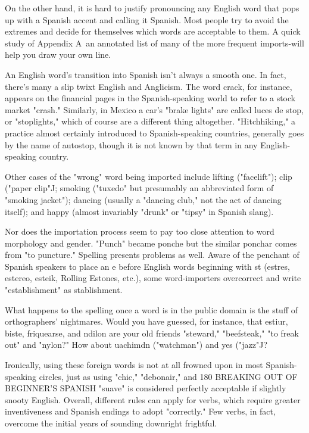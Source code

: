 On the other hand, it is hard to justify pronouncing any English word that pops up with a Spanish accent and calling it Spanish.
Most people try to avoid the extremes and decide for themselves which
words are acceptable to them. A quick study of Appendix A~an annotated list of many of the more frequent imports-will help you draw
your own line.

An English word's transition into Spanish isn't always a
smooth one. In fact, there's many a slip twixt English and Anglicism.
The word crack, for instance, appears on the financial pages in the
Spanish-speaking world to refer to a stock market "crash." Similarly,
in Mexico a car's "brake lights" are called luces de stop, or "stoplights," which of course are a different thing altogether. "Hitchhiking,"
a practice almost certainly introduced to Spanish-speaking countries,
generally goes by the name of autostop, though it is not known by that
term in any English-speaking country.

Other cases of the "wrong" word being imported include lifting ("facelift"); clip ("paper clip"J; smoking ("tuxedo" but presumably
an abbreviated form of "smoking jacket"); dancing (usually a "dancing club," not the act of dancing itself); and happy (almost invariably
"drunk" or "tipsy" in Spanish slang).

Nor does the importation process seem to pay too close attention to word morphology and gender. "Punch" became ponche but the
similar ponchar comes from "to puncture." Spelling presents problems
as well. Aware of the penchant of Spanish speakers to place an e before English words beginning with st (estres, estereo, esteik, Rolling
Estones, etc.), some word-importers overcorrect and write "establishment" as stablishment.

What happens to the spelling once a word is in the public
domain is the stuff of orthographers' nightmares. Would you have
guessed, for instance, that estiur, biste, friquearse, and ndilon are your
old friends "steward," "beefsteak," "to freak out" and "nylon?" How
about uachimdn ("watchman") and yes ("jazz"J?

Ironically, using these foreign words is not at all frowned upon
in most Spanish-speaking circles, just as using "chic," "debonair," and
180 BREAKING OUT OF BEGINNER'S SPANISH
"suave" is considered perfectly acceptable if slightly snooty English.
Overall, different rules can apply for verbs, which require greater inventiveness and Spanish endings to adopt "correctly." Few verbs, in
fact, overcome the initial years of sounding downright frightful.


